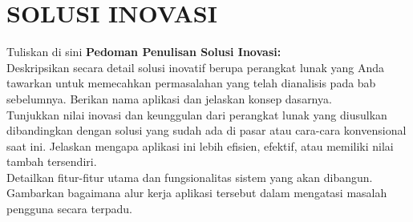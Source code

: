 \chapter{SOLUSI INOVASI}


Tuliskan di sini \textbf{Pedoman Penulisan Solusi Inovasi:} \\
Deskripsikan secara detail solusi inovatif berupa perangkat lunak yang Anda tawarkan untuk memecahkan permasalahan yang telah dianalisis pada bab sebelumnya. Berikan nama aplikasi dan jelaskan konsep dasarnya.\\
Tunjukkan nilai inovasi dan keunggulan dari perangkat lunak yang diusulkan dibandingkan dengan solusi yang sudah ada di pasar atau cara-cara konvensional saat ini. Jelaskan mengapa aplikasi ini lebih efisien, efektif, atau memiliki nilai tambah tersendiri.\\
Detailkan fitur-fitur utama dan fungsionalitas sistem yang akan dibangun. Gambarkan bagaimana alur kerja aplikasi tersebut dalam mengatasi masalah pengguna secara terpadu.

